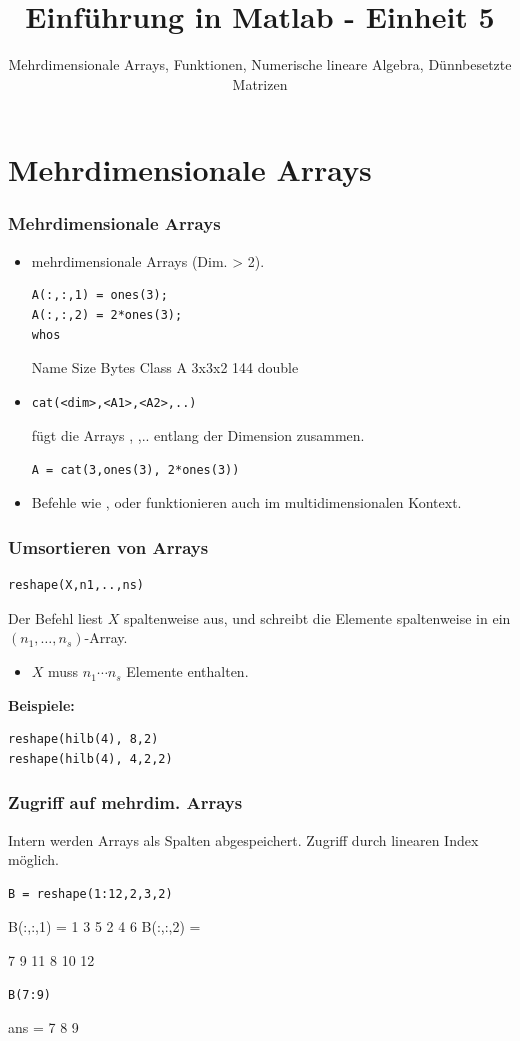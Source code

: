 \documentclass[hyperref={xetex}]{beamer}
\title{Einführung in Matlab - Einheit 5}
\subtitle{Mehrdimensionale Arrays, Funktionen, Numerische lineare Algebra, Dünnbesetzte Matrizen}
\begin{document}
\titlepage

\section{Mehrdimensionale Arrays}
%
%
%
\begin{frame}[fragile]\frametitle{Mehrdimensionale Arrays}
\begin{itemize}
\item mehrdimensionale Arrays (Dim. > 2).
\begin{lstlisting}
A(:,:,1) = ones(3);
A(:,:,2) = 2*ones(3);
whos
\end{lstlisting}
\begin{matlab}
  Name   Size   Bytes  Class  
  A      3x3x2    144  double  
\end{matlab}
\item 
\begin{lstlisting}
cat(<dim>,<A1>,<A2>,..) 
\end{lstlisting}
f\"ugt die Arrays , ,.. entlang der Dimension  zusammen. 
\begin{lstlisting}
A = cat(3,ones(3), 2*ones(3))
\end{lstlisting}
\item Befehle wie \alert{ }, \alert{ } oder \alert{
  } funktionieren auch im multidimensionalen Kontext.
\end{itemize}
\end{frame}
%
%
\begin{frame}[fragile]\frametitle{Umsortieren von Arrays}
\begin{lstlisting}
reshape(X,n1,..,ns)
\end{lstlisting}
Der Befehl liest $X$ spaltenweise
aus, und schreibt die Elemente spaltenweise in ein $(n_1, \dots,
n_s)$-Array. 
\begin{itemize}
\item $X$ muss $n_1 \cdots n_s$ Elemente enthalten.
\end{itemize}
\textbf{Beispiele:}
\begin{lstlisting}
reshape(hilb(4), 8,2)
reshape(hilb(4), 4,2,2)
\end{lstlisting}
\end{frame}
%
%
\begin{frame}[fragile]\frametitle{Zugriff auf mehrdim. Arrays}
Intern werden Arrays als Spalten abgespeichert. Zugriff durch linearen
  Index m\"oglich. 
\begin{lstlisting}
B = reshape(1:12,2,3,2)
\end{lstlisting}
\begin{matlab}
B(:,:,1) =
     1     3     5
     2     4     6
B(:,:,2) =

     7     9    11
     8    10    12
\end{matlab}
\begin{lstlisting}
B(7:9)
\end{lstlisting}
\begin{matlab}
ans =
     7     8     9
\end{matlab}
\end{frame}
\end{document}
